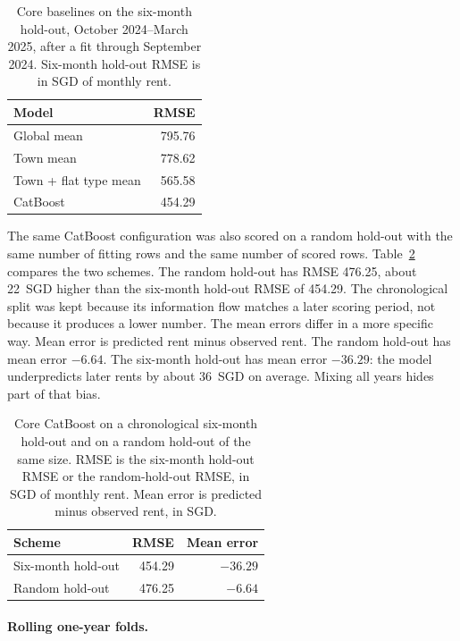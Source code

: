 \documentclass[11pt,a4paper]{article}
\begin{document}
\begin{table}[htbp]
\centering
\caption{Core baselines on the six-month hold-out, October 2024--March 2025, after a fit through September 2024.
Six-month hold-out RMSE is in SGD of monthly rent.}
\label{tab:baseline-results}
\small
\begin{tabular}{lr}
\toprule
Model & RMSE \\
\midrule
Global mean & 795.76 \\
Town mean & 778.62 \\
Town + flat type mean & 565.58 \\
CatBoost & 454.29 \\
\bottomrule
\end{tabular}
\end{table}

The same CatBoost configuration was also scored on a random hold-out with the same number of fitting rows and the same number of scored rows.
Table~\ref{tab:random-temporal} compares the two schemes.
The random hold-out has RMSE 476.25, about 22~SGD higher than the six-month hold-out RMSE of 454.29.
The chronological split was kept because its information flow matches a later scoring period, not because it produces a lower number.
The mean errors differ in a more specific way.
Mean error is predicted rent minus observed rent.
The random hold-out has mean error \(-6.64\).
The six-month hold-out has mean error \(-36.29\): the model underpredicts later rents by about 36~SGD on average.
Mixing all years hides part of that bias.

\begin{table}[htbp]
\centering
\caption{Core CatBoost on a chronological six-month hold-out and on a random hold-out of the same size.
RMSE is the six-month hold-out RMSE or the random-hold-out RMSE, in SGD of monthly rent.
Mean error is predicted minus observed rent, in SGD.}
\label{tab:random-temporal}
\small
\begin{tabular}{lrr}
\toprule
Scheme & RMSE & Mean error \\
\midrule
Six-month hold-out & 454.29 & $-36.29$ \\
Random hold-out & 476.25 & $-6.64$ \\
\bottomrule
\end{tabular}
\end{table}

\paragraph{Rolling one-year folds.}
\label{sec:rolling}
\end{document}
